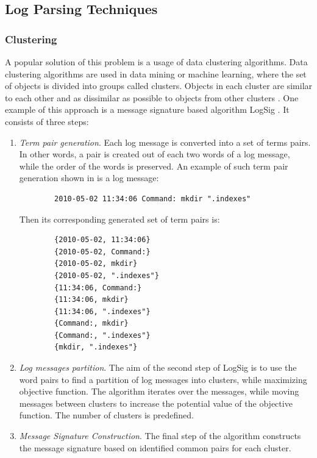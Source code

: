 \subsection{Log Parsing Techniques} \label{log_parsing_techniques}
    
    \subsubsection*{Clustering} 
    A popular solution of this problem is a usage of data clustering algorithms. Data clustering algorithms are used in data mining or machine learning, where the set of objects is divided into groups called clusters. Objects in each cluster are similar to each other and as dissimilar as possible to objects from other clusters \cite{vaarandi2003}. One example of this approach is a message signature based algorithm LogSig \cite{logsig2011}. It consists of three steps: 
    
    \begin{enumerate}
        \item \textit{Term pair generation}. Each log message is converted into a set of terms pairs. In other words, a pair is created out of each two words of a log message, while the order of the words is preserved. An example of such term pair generation shown in \cite{logsig2011} is a log message: 
        
        \begin{verbatim}
        2010-05-02 11:34:06 Command: mkdir ".indexes"
        \end{verbatim}
        
        Then its corresponding generated set of term pairs is: \\
        \begin{verbatim}
        {2010-05-02, 11:34:06}
        {2010-05-02, Command:}
        {2010-05-02, mkdir}
        {2010-05-02, ".indexes"}
        {11:34:06, Command:}
        {11:34:06, mkdir}
        {11:34:06, ".indexes"}
        {Command:, mkdir}
        {Command:, ".indexes"}
        {mkdir, ".indexes"}
        \end{verbatim}

        \item \textit{Log messages partition}. The aim of the second step of LogSig is to use the word pairs to find a partition of log messages into clusters, while maximizing objective function. The algorithm iterates over the messages, while moving messages between clusters to increase the potential value of the objective function. The number of clusters is predefined. 
        
        \item \textit{Message Signature Construction}. The final step of the algorithm constructs the message signature based on identified common pairs for each cluster.
    \end{enumerate}
    
